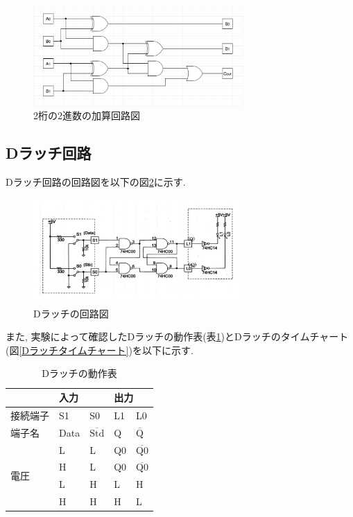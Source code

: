 \documentclass[a4paper, 11pt, uplatex]{jsarticle}
\begin{document}
\begin{figure}[H]
  \begin{center}
    \includegraphics[width = 8cm]{画像/加算回路.png}
    \caption{2桁の2進数の加算回路図}
    \label{加算回路}
  \end{center}
\end{figure}


\subsection{Dラッチ回路}

Dラッチ回路の回路図を以下の図\ref{Dラッチ}に示す.

\begin{figure}[H]
  \begin{center}
    \includegraphics[width = 8cm]{画像/Dラッチ.png}
    \caption{Dラッチの回路図}
    \label{Dラッチ}
  \end{center}
\end{figure}

また,  実験によって確認したDラッチの動作表(表\ref{Dラッチ動作表})とDラッチのタイムチャート(図\ref{Dラッチタイムチャート})を以下に示す.

\begin{table}[H]
  \begin{center}
  \caption{Dラッチの動作表}
  \label{Dラッチ動作表}
\begin{tabular}{|l|l|l|l|l|}
\hline
                    & \multicolumn{2}{l|}{入力} & \multicolumn{2}{l|}{出力}  \\ \hline
接続端子               & S1         & S0         & L1    &L0\\ \hline
端子名                 & Data          & $\overline{\mathrm{Std}}$          &Q     &$\overline{\mathrm{Q}}$\\ \hline \hline
\multirow{4}{*}{電圧} & L          & L          &Q0      &$\overline{\mathrm{Q0}}$\\
                     & H          & L          &Q0      &$\overline{\mathrm{Q0}}$\\
                     & L          & H          &L      &H  \\
                     & H          & H          &H      &L  \\ \hline
\end{tabular}
\end{center}
\end{table}
\end{document}
